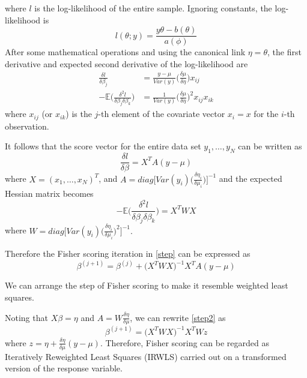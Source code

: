 \documentclass[11pt]{vantage6} %
\begin{document}
where $l$ is the log-likelihood of the entire sample. Ignoring constants, the log-likelihood is
$$
l(\theta; y) = \frac{y \theta - b(\theta)}{a(\phi)}
$$
After some mathematical operations and using the canonical link $\eta=\theta$, the first derivative and expected second derivative of the log-likelihood are
\begin{align*}
\frac{\delta l}{\delta \beta_j}&=\frac{y-\mu}{Var(y)}\Bigg(\frac{\delta \mu}{\delta \eta} \Bigg) x_{ij}\\
-\mathbb{E}\Bigg(\frac{\delta^2 l}{\delta \beta_j \delta \beta_k} \Bigg)&=\frac{1}{Var(y)}\Bigg(\frac{\delta \mu}{\delta \eta} \Bigg)^2 x_{ij}x_{ik}
\end{align*}
where $x_{ij}$ (or $x_{ik}$) is the $j$-th element of the covariate vector $x_i = x$ for the $i$-th observation.

It follows that the score vector for the entire data set $y_1,\ldots, y_N$ can be written as
\begin{equation}
\frac{\delta l}{\delta \beta}=X^TA(y-\mu)
\end{equation}\label{score}
where $X=(x_1,\ldots,x_N)^T$, and
$
A=diag \Big[ Var(y_i) \Big(\frac{\delta \eta_i}{\delta \mu_i} \Big) \Big]^{-1}
$
and the expected Hessian matrix becomes
$$
-\mathbb{E}\Bigg(\frac{\delta^2 l}{\delta \beta_j \delta \beta_k} \Bigg)=X^TWX
$$
where
$
W=diag \Big[ Var(y_i) \Big(\frac{\delta \eta_i}{\delta \mu_i} \Big)^2 \Big]^{-1}.
$

Therefore the Fisher scoring iteration in \ref{step} can be expressed as
\begin{equation}
\beta^{(j+1)}=\beta^{(j)}+ \big(X^TWX\big)^{-1} X^TA(y-\mu)
\end{equation}\label{step2}

We can arrange the step of Fisher scoring to make it resemble weighted least squares.

Noting that $X\beta=\eta$ and $A=W \frac{\delta \eta}{\delta \mu}$, we can rewrite \ref{step2} as
\begin{equation}
\beta^{(j+1)}=\big(X^TWX\big)^{-1} X^TWz
\end{equation}\label{step4}
where $z=\eta + \frac{\delta \eta}{\delta \mu}(y-\mu)$. Therefore, Fisher scoring can be regarded as Iteratively Reweighted Least
Squares (IRWLS) carried out on a transformed version of the response variable.
\end{document}
